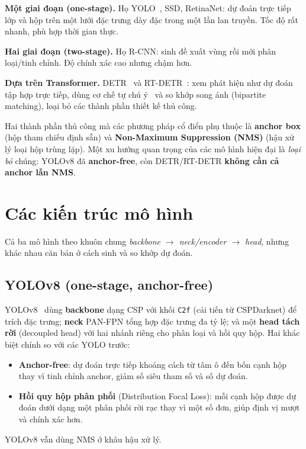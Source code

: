 \documentclass[12pt]{article}
\newcommand{\runin}[1]{\par\medskip\noindent\textbf{#1}\hspace{0.4em}\ignorespaces}
\numberwithin{equation}{section}
\begin{document}
\runin{Một giai đoạn (one-stage).} Họ YOLO~\cite{yolov1,yolov8}, SSD, RetinaNet: dự đoán
trực tiếp lớp và hộp trên một lưới đặc trưng dày đặc trong một lần lan truyền. Tốc độ rất
nhanh, phù hợp thời gian thực.

\runin{Hai giai đoạn (two-stage).} Họ R-CNN: sinh đề xuất vùng rồi mới phân loại/tinh chỉnh.
Độ chính xác cao nhưng chậm hơn.

\runin{Dựa trên Transformer.} DETR~\cite{detr} và RT-DETR~\cite{rtdetr}: xem phát hiện như
dự đoán tập hợp trực tiếp, dùng cơ chế tự chú ý~\cite{transformer} và so khớp song ánh
(bipartite matching), loại bỏ các thành phần thiết kế thủ công.

Hai thành phần thủ công mà các phương pháp cổ điển phụ thuộc là \textbf{anchor box} (hộp
tham chiếu định sẵn) và \textbf{Non-Maximum Suppression (NMS)} (hậu xử lý loại hộp trùng
lặp). Một xu hướng quan trọng của các mô hình hiện đại là \textit{loại bỏ} chúng: YOLOv8 đã
\textbf{anchor-free}, còn DETR/RT-DETR \textbf{không cần cả anchor lẫn NMS}.

\section{Các kiến trúc mô hình}

Cả ba mô hình theo khuôn chung \textit{backbone $\rightarrow$ neck/encoder $\rightarrow$ head},
nhưng khác nhau căn bản ở cách sinh và so khớp dự đoán.

\subsection{YOLOv8 (one-stage, anchor-free)}

YOLOv8~\cite{yolov8} dùng \textbf{backbone} dạng CSP với khối \texttt{C2f} (cải tiến từ
CSPDarknet) để trích đặc trưng; \textbf{neck} PAN-FPN tổng hợp đặc trưng đa tỷ lệ; và một
\textbf{head tách rời} (decoupled head) với hai nhánh riêng cho phân loại và hồi quy hộp.
Hai khác biệt chính so với các YOLO trước:
\begin{itemize}
  \item \textbf{Anchor-free}: dự đoán trực tiếp khoảng cách từ tâm ô đến bốn cạnh hộp thay vì
  tinh chỉnh anchor, giảm số siêu tham số và số dự đoán.
  \item \textbf{Hồi quy hộp phân phối} (Distribution Focal Loss): mỗi cạnh hộp được dự đoán
  dưới dạng một phân phối rời rạc thay vì một số đơn, giúp định vị mượt và chính xác hơn.
\end{itemize}
YOLOv8 vẫn dùng NMS ở khâu hậu xử lý.
\end{document}

